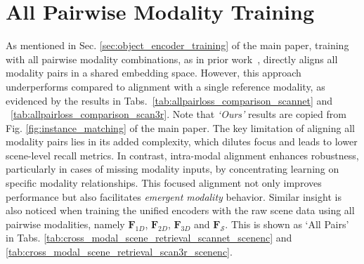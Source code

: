 \section{All Pairwise Modality Training}
\label{sec:all_pairwise_modality}
As mentioned in Sec. \ref{sec:object_encoder_training} of the main paper, training with all pairwise modality combinations, as in prior work~\cite{xue2023ulip2,pointbind}, directly aligns all modality pairs in a shared embedding space. However, this approach underperforms compared to alignment with a single reference modality, as evidenced by the results in Tabs.~\ref{tab:allpairloss_comparison_scannet} and ~\ref{tab:allpairloss_comparison_scan3r}. Note that \textit{`Ours'} results are copied from Fig. \ref{fig:instance_matching} of the main paper. The key limitation of aligning all modality pairs lies in its added complexity, which dilutes focus and leads to lower scene-level recall metrics. In contrast, intra-modal alignment enhances robustness, particularly in cases of missing modality inputs, by concentrating learning on specific modality relationships. This focused alignment not only improves performance but also facilitates \textit{emergent modality} behavior. Similar insight is also noticed when training the unified encoders with the raw scene data using all pairwise modalities, namely $\mathbf{F}_{1D}$, $\mathbf{F}_{2D}$, $\mathbf{F}_{3D}$ and $\mathbf{F}_{\mathcal{S}}$. This is shown as `All Pairs' in Tabs. \ref{tab:cross_modal_scene_retrieval_scannet_scenenc} and \ref{tab:cross_modal_scene_retrieval_scan3r_scenenc}.





